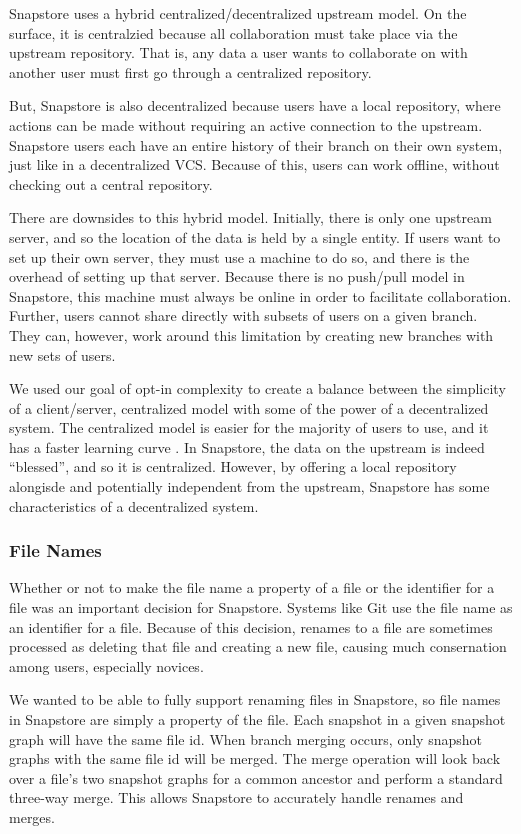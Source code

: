 Snapstore uses a hybrid centralized/decentralized upstream model. On the surface, it is centralzied because all collaboration must take place via the upstream repository. That is, any data a user wants to collaborate on with another user must first go through a centralized repository.

But, Snapstore is also decentralized because users have a local repository, where actions can be made without requiring an active connection to the upstream. Snapstore users each have an entire history of their branch on their own system, just like in a decentralized VCS. Because of this, users can work offline, without checking out a central repository.

There are downsides to this hybrid model. Initially, there is only one upstream server, and so the location of the data is held by a single entity. If users want to set up their own server, they must use a machine to do so, and there is the overhead of setting up that server. Because there is no push/pull model in Snapstore, this machine must always be online in order to facilitate collaboration. Further, users cannot share directly with subsets of users on a given branch. They can, however, work around this limitation by creating new branches with new sets of users.

We used our goal of opt-in complexity to create a balance between the simplicity of a client/server, centralized model with some of the power of a decentralized system. The centralized model is easier for the majority of users to use, and it has a faster learning curve \cite{Brindescu}. In Snapstore, the data on the upstream is indeed ``blessed'', and so it is centralized. However, by offering a local repository alongisde and potentially independent from the upstream, Snapstore has some characteristics of a decentralized system.

\subsubsection{File Names}

Whether or not to make the file name a property of a file or the identifier for a file was an important decision for Snapstore. Systems like Git use the file name as an identifier for a file. Because of this decision, renames to a file are sometimes processed as deleting that file and creating a new file, causing much consernation among users, especially novices\cite{RossoJackson}.

We wanted to be able to fully support renaming files in Snapstore, so file names in Snapstore are simply a property of the file. Each snapshot in a given snapshot graph will have the same file id. When branch merging occurs, only snapshot graphs with the same file id will be merged. The merge operation will look back over a file's two snapshot graphs for a common ancestor and perform a standard three-way merge. This allows Snapstore to accurately handle renames and merges.




